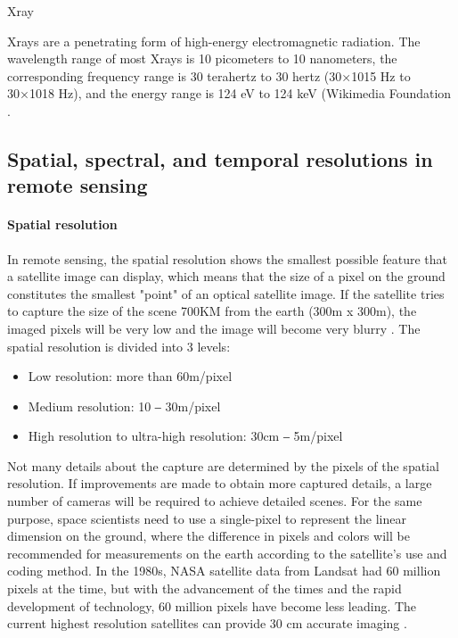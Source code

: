 \documentclass[conference]{IEEEtran}
\newcommand{\subparagraph}{}
\begin{document}
\subparagraph{X\-ray}
    
X\-rays are a penetrating form of high-energy electromagnetic radiation. The wavelength range of most X\-rays is 10 picometers 
to 10 nanometers, the corresponding frequency range is 30 terahertz to 30 hertz (30×1015 Hz to 30×1018 Hz), and the energy range 
is 124 eV to 124 keV (Wikimedia Foundation \cite{XrayWiki61:online}.

\subsection{Spatial, spectral, and temporal resolutions in remote sensing}
    
\paragraph{Spatial resolution} 
    
In remote sensing, the spatial resolution shows the smallest possible feature that a satellite image can display, which means 
that the size of a pixel on the ground constitutes the smallest "point" of an optical satellite image. If the satellite tries 
to capture the size of the scene 700KM from the earth (300m x 300m), the imaged pixels will be very low and the image will become 
very blurry \cite{AtlasAIW26:online}. The spatial resolution is divided into 3 levels:
    
	\begin{itemize}
		\item Low resolution: more than 60m/pixel 
		\item Medium resolution: 10 ‒ 30m/pixel 
		\item High resolution to ultra-high resolution: 30cm ‒ 5m/pixel
	\end{itemize}
    
Not many details about the capture are determined by the pixels of the spatial resolution. If improvements are made to obtain 
more captured details, a large number of cameras will be required to achieve detailed scenes. For the same purpose, space scientists 
need to use a single-pixel to represent the linear dimension on the ground, where the difference in pixels and colors will be 
recommended for measurements on the earth according to the satellite's use and coding method. In the 1980s, NASA satellite data from 
Landsat had 60 million pixels at the time, but with the advancement of the times and the rapid development of technology, 60 million 
pixels have become less leading. The current highest resolution satellites can provide 30 cm accurate imaging \cite{Satellit48:online}. 
\end{document}

